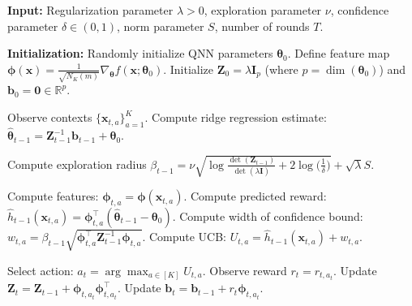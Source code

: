 \documentclass[pdflatex,sn-mathphys-num]{sn-jnl}%
\theoremstyle{thmstyleone}%
\theoremstyle{thmstyletwo}%
\theoremstyle{thmstylethree}%
\newcommand{\xbf}{\mathbf{x}}
\newcommand{\Ibf}{\mathbf{I}}
\newcommand{\phibf}{\bm{\phi}}
\newcommand{\Zbf}{\mathbf{Z}}
\newcommand{\bbf}{\mathbf{b}}
\newcommand{\thetabf}{\bm{\theta}}
\begin{document}
\begin{algorithm}[h]
\caption{QNTK-UCB Algorithm}\label{alg:qntk-ucb}
\begin{algorithmic}[1]
\State \textbf{Input:} Regularization parameter $\lambda > 0$, exploration parameter $\nu$, confidence parameter $\delta \in (0, 1)$, norm parameter $S$, number of rounds $T$.

\State \textbf{Initialization:}
\State Randomly initialize QNN parameters ${\thetabf}_0$.
\State Define feature map $\phibf(\xbf) = \frac{1}{\sqrt{N_K(m)}}\nabla_{{\thetabf}} f(\xbf;{\thetabf}_0)$.
\State Initialize $\Zbf_0 = \lambda \Ibf_p$ (where $p = \dim({\thetabf}_0)$) and $\bbf_0 = \mathbf{0} \in \mathbb{R}^p$. %


\State Observe contexts $\{\xbf_{t,a}\}_{a=1}^K$.
\State Compute ridge regression estimate: $\hat{{\thetabf}}_{t-1} = \Zbf_{t-1}^{-1} \bbf_{t-1} +\thetabf_0 $.

\State Compute exploration radius $\beta_{t-1} = \nu\sqrt{\log\frac{\det(\Zbf_{t-1})}{\det(\lambda \Ibf)} + 2\log\big(\frac{1}{\delta}\big)}
+\sqrt{\lambda}S.$

\State Compute features: $\phibf_{t,a} = \phibf(\xbf_{t,a})$.
\State Compute predicted reward: $\hat{h}_{t-1}(\xbf_{t,a}) = \phibf_{t,a}^\top (\hat{{\thetabf}}_{t-1}-\thetabf_0)$.
\State Compute  width of confidence bound: $w_{t,a} = \beta_{t-1} \sqrt{\phibf_{t,a}^\top \Zbf_{t-1}^{-1} \phibf_{t,a}}$.
\State Compute UCB: $U_{t,a} = \hat{h}_{t-1}(\xbf_{t,a}) + w_{t,a}$.
\EndFor

\State Select action: $a_t = \arg\max_{a \in [K]} U_{t,a}$.
\State Observe reward $r_t = r_{t,a_t}$.
\State Update $\Zbf_t = \Zbf_{t-1} + \phibf_{t,a_t} \phibf_{t,a_t}^\top$.
\State Update $\bbf_t = \bbf_{t-1} + r_t \phibf_{t,a_t}$.
\EndFor

\end{algorithmic}
\end{algorithm}
\end{document}
